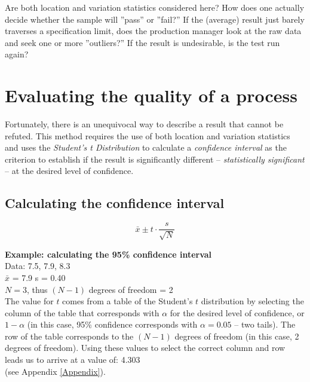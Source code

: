 Are both location and variation statistics considered here?  How does one actually decide whether the sample will ''pass'' or ''fail?''  If the (average) result just barely traverses a specification limit, does the production manager look at the raw data and seek one or more ''outliers?''  If the result is undesirable, is the test run again?
  
  
\section{Evaluating the quality of a process}
Fortunately, there is an unequivocal way to describe a result that cannot be refuted.  This method requires the use of both location and variation statistics and uses the \textit{Student's t Distribution} to calculate a \textit{confidence interval} as the criterion to establish if the result is significantly different -- \textit{statistically significant} -- at the desired level of confidence.

\subsection{Calculating the confidence interval}
\begin{center}
\begin{equation}
\bar{x} \pm t \cdot \frac{s}{\sqrt{N}}
\end{equation}
\end{center}


\textbf{Example: calculating the 95\% confidence interval}\\

Data: 7.5, 7.9, 8.3\\

$ \bar{x} $ = 7.9  s = 0.40\\

$ N = 3$, thus $(N-1)$ degrees of freedom = 2 \\

The value for $ t $ comes from a table of the Student’s $ t $ distribution by selecting the column of the table that corresponds with $ \alpha $ for the desired level of confidence, or $1-\alpha$ (in this case, 95\% confidence corresponds with $ \alpha = 0.05 $ -- two tails).  The row of the table corresponds to the $(N-1)$ degrees of freedom (in this case, 2 degrees of freedom). Using these values to select the correct column and row leads us to arrive at a value of: 4.303\\  (see Appendix \ref{Appendix}).

